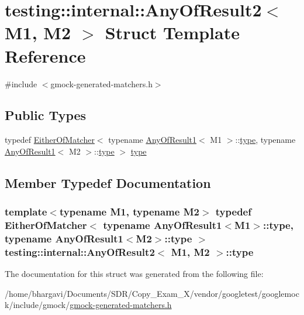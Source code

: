 \hypertarget{structtesting_1_1internal_1_1_any_of_result2}{}\section{testing\+:\+:internal\+:\+:Any\+Of\+Result2$<$ M1, M2 $>$ Struct Template Reference}
\label{structtesting_1_1internal_1_1_any_of_result2}


{\ttfamily \#include $<$gmock-\/generated-\/matchers.\+h$>$}

\subsection*{Public Types}
\begin{DoxyCompactItemize}
\item 
typedef \hyperlink{classtesting_1_1internal_1_1_either_of_matcher}{Either\+Of\+Matcher}$<$ typename \hyperlink{structtesting_1_1internal_1_1_any_of_result1}{Any\+Of\+Result1}$<$ M1 $>$\+::\hyperlink{structtesting_1_1internal_1_1_any_of_result2_a6d9eba508021f8e652c7c154a649073f}{type}, typename \hyperlink{structtesting_1_1internal_1_1_any_of_result1}{Any\+Of\+Result1}$<$ M2 $>$\+::\hyperlink{structtesting_1_1internal_1_1_any_of_result2_a6d9eba508021f8e652c7c154a649073f}{type} $>$ \hyperlink{structtesting_1_1internal_1_1_any_of_result2_a6d9eba508021f8e652c7c154a649073f}{type}
\end{DoxyCompactItemize}


\subsection{Member Typedef Documentation}
\subsubsection[{\texorpdfstring{type}{type}}]{\setlength{\rightskip}{0pt plus 5cm}template$<$typename M1, typename M2$>$ typedef {\bf Either\+Of\+Matcher}$<$ typename {\bf Any\+Of\+Result1}$<$M1$>$\+::{\bf type}, typename {\bf Any\+Of\+Result1}$<$M2$>$\+::{\bf type} $>$ {\bf testing\+::internal\+::\+Any\+Of\+Result2}$<$ M1, M2 $>$\+::{\bf type}}\hypertarget{structtesting_1_1internal_1_1_any_of_result2_a6d9eba508021f8e652c7c154a649073f}{}\label{structtesting_1_1internal_1_1_any_of_result2_a6d9eba508021f8e652c7c154a649073f}


The documentation for this struct was generated from the following file\+:\begin{DoxyCompactItemize}
\item 
/home/bhargavi/\+Documents/\+S\+D\+R/\+Copy\+\_\+\+Exam\+\_\+X/vendor/googletest/googlemock/include/gmock/\hyperlink{gmock-generated-matchers_8h}{gmock-\/generated-\/matchers.\+h}\end{DoxyCompactItemize}
